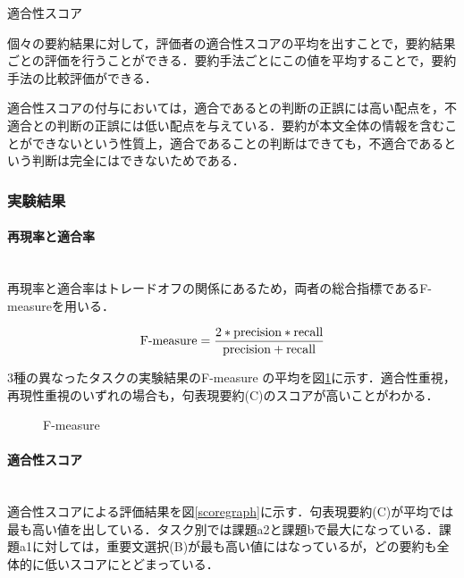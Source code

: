 \begin{table}[htbp]
  \begin{center}
    \caption{適合性スコア}
    \label{score}
  \end{center}
\end{table}

個々の要約結果に対して，評価者の適合性スコアの平均を出すことで，要約結果ごとの評価を行うことができる．要約手法ごとにこの値を平均することで，要約手法の比較評価ができる．

適合性スコアの付与においては，適合であるとの判断の正誤には高い配点を，不適合との判断の正誤には低い配点を与えている．要約が本文全体の情報を含むことができないという性質上，適合であることの判断はできても，不適合であるという判断は完全にはできないためである．


\subsubsection{実験結果}

\paragraph{再現率と適合率} ~ \\
\indent
再現率と適合率はトレードオフの関係にあるため，両者の総合指標であるF-measureを用いる．

\[
 \mbox{F-measure} = \frac{2 \ast {\rm precision} \ast {\rm recall}}{{\rm precision} + {\rm recall}}
\]

3種の異なったタスクの実験結果のF-measure の平均を図\ref{fmeasure}に示す．適合性重視，再現性重視のいずれの場合も，句表現要約(C)のスコアが高いことがわかる．

\begin{figure}[htbp]
  \begin{center}
    \caption{F-measure}
    \label{fmeasure}
  \end{center}
\end{figure}

\paragraph{適合性スコア} ~ \\
\indent
適合性スコアによる評価結果を図\ref{scoregraph}に示す．句表現要約(C)が平均では最も高い値を出している．タスク別では課題a2と課題bで最大になっている．課題a1に対しては，重要文選択(B)が最も高い値にはなっているが，どの要約も全体的に低いスコアにとどまっている．

